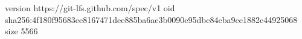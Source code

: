 version https://git-lfs.github.com/spec/v1
oid sha256:4f180f95683ee8167471dee885ba6ae3b0090e95dbc84cba9ce1882c44925068
size 5566

